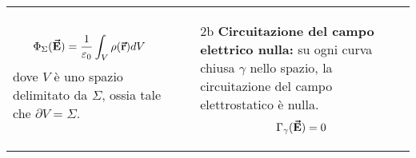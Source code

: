 \begin{remember}
\begin{tabular}{p{}p{}}
\begin{itemize}
				\begin{equation*}
					\Phi_\Sigma(\vb*{\va{E}})=\frac{1}{\varepsilon_0}\int_{V}\rho(\vb*{\va{r}})dV
				\end{equation*}
				dove $V$ è uno spazio delimitato da $\Sigma$, ossia tale che $\partial V=\Sigma$.
			\end{itemize} &
			\begin{itemize}
				\item[2b] \textbf{Circuitazione del campo elettrico nulla:} su ogni curva chiusa $\gamma$ nello spazio, la circuitazione del campo elettrostatico è nulla.
				\begin{equation*}
					\Gamma_{\gamma}(\vb*{\va{E}})=0
				\end{equation*}
			\end{itemize}
		\end{tabular}
\end{remember}
